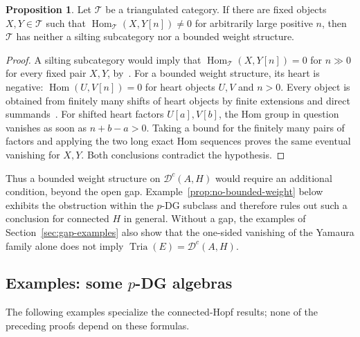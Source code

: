 \documentclass[11pt]{article}
\theoremstyle{definition}
\newtheorem{prop}[thm]{Proposition}
\numberwithin{equation}{section}
\newcommand{\Dc}{\mathcal{D}^c(A,H)}
\newcommand{\Hom}{\operatorname{Hom}}
\newcommand{\tria}{\operatorname{Tria}}
\begin{document}
\begin{prop}
\label{prop:positive-Hom-obstruction}
Let $\mathcal T$ be a triangulated category.  If there are fixed objects
$X,Y\in\mathcal T$ such that $\Hom_{\mathcal T}(X,Y[n])\ne0$ for
arbitrarily large positive $n$, then $\mathcal T$ has neither a silting
subcategory nor a bounded weight structure.
\end{prop}
\begin{proof}
A silting subcategory would imply that
$\Hom_{\mathcal T}(X,Y[n])=0$ for $n\gg0$ for every fixed pair $X,Y$,
by~\cite[Proposition~2.4]{AiharaIyama}.
For a bounded weight structure, its heart is negative:
$\Hom(U,V[n])=0$ for heart objects $U,V$ and $n>0$.
Every object is obtained from finitely many shifts of heart objects
by finite extensions and direct summands~\cite{BondarkoWeight}.
For shifted heart factors $U[a],V[b]$, the Hom group in question
vanishes as soon as $n+b-a>0$.  Taking a bound for the finitely many
pairs of factors and applying the two long exact Hom sequences proves
the same eventual vanishing for $X,Y$.  Both conclusions contradict
the hypothesis.
\end{proof}

Thus a bounded weight structure on $\Dc$ would require an additional
condition, beyond the open gap.  Example~\ref{prop:no-bounded-weight}
below exhibits the obstruction within the $p$-DG subclass and therefore
rules out such a conclusion for connected $H$ in general.  Without a
gap, the examples of Section~\ref{sec:gap-examples} also show that the
one-sided vanishing of the Yamaura family alone does not imply
$\tria(E)=\Dc$.

\subsection{Examples: some \texorpdfstring{$p$}{p}-DG algebras}
\label{sec:window-pdg}
The following examples specialize the connected-Hopf results; none of
the preceding proofs depend on these formulas.
\end{document}
